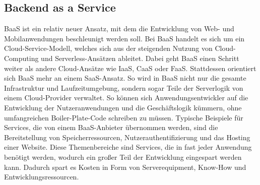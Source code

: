 \subsection{Backend as a Service}
\ac{BaaS} ist ein relativ neuer Ansatz, mit dem die Entwicklung von Web- und Mobilanwendungen beschleunigt werden soll.
Bei \ac{BaaS} handelt es sich um ein Cloud-Service-Modell, welches sich aus der steigenden Nutzung von Cloud-Computing und Serverless-Ansätzen ableitet.
Dabei geht \ac{BaaS} einen Schritt weiter als andere Cloud-Ansätze wie \ac{IaaS}, \ac{CaaS} oder \ac{FaaS}.
Stattdessen orientiert sich \ac{BaaS} mehr an einem \ac{SaaS}-Ansatz. %
So wird in \ac{BaaS} nicht nur die gesamte Infrastruktur und Laufzeitumgebung, sondern sogar Teile der Serverlogik von einem Cloud-Provider verwaltet.\autocite[Vgl.][]{cloudflareBaaS}
So können sich Anwendungsentwickler auf die Entwicklung der Nutzeranwendungen und die Geschäftslogik kümmern, ohne umfangreichen Boiler-Plate-Code schreiben zu müssen.
Typische Beispiele für Services, die von einem \ac{BaaS}-Anbieter übernommen werden, sind die Bereitstellung von Speicherressourcen, Nutzerauthentifizierung und das Hosting einer Website.
Diese Themenbereiche sind Services, die in fast jeder Anwendung benötigt werden, wodurch ein großer Teil der Entwicklung eingespart werden kann.
Dadurch spart es Kosten in Form von Serverequipment, Know-How und Entwicklungsressourcen.


